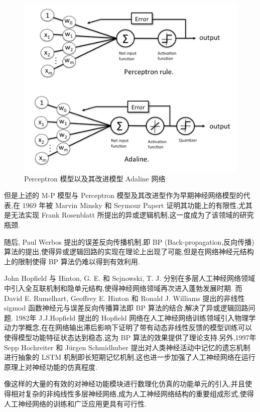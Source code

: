 \begin{figure}[H]
	\centering
	\includegraphics[scale=0.7]{Figures/perceptron.png}
	\caption{Perceptron 模型以及其改进模型 Adaline 网络}
\end{figure}

但是上述的 M-P 模型与 Perceptron 模型及其改进型作为早期神经网络模型的代表,在 1969 年被 Marvin Minsky 和 Seymour Papert 证明其功能上的有限性,尤其是无法实现 Frank Rosenblatt 所提出的异或逻辑机制,这一度成为了该领域的研究瓶颈.\cite{perceptronlimit}

随后, Paul Werbos 提出的误差反向传播机制,即 BP (Back-propagation,反向传播) 算法的提出,使得异或逻辑回路的实现在理论上出现了可能,但是在网络神经元结构上的限制使得 BP 算法仍难以得到有效利用.

John Hopfield 与 Hinton, G. E. 和 Sejnowski, T. J. 分别在多层人工神经网络领域中引入全互联机制和隐单元结构,使得神经网络领域再次进入蓬勃发展时期. 而 David E. Rumelhart, Geoffrey E. Hinton 和 Ronald J. Williams 提出的非线性 sigmod 函数神经元与误差反向传播算法即 BP 算法的结合,解决了异或逻辑回路问题. 1982年 J.J.Hopfield 提出的 Hopfield 网络在人工神经网络训练领域引入物理学动力学概念,在在网络输出滞后影响下证明了带有动态非线性反馈的模型训练可以使得模型功能特征状态达到稳态\cite{bp},这为 BP 算法的效果提供了理论支持.另外,1997年 Sepp Hochreiter 和 Jürgen Schmidhuber 提出对人类神经活动中记忆的遗忘机制进行抽象的 LSTM 机制即长短期记忆机制\cite{lstm},这也进一步加强了人工神经网络在运行原理上对神经功能的仿真程度.

像这样的大量的有效的对神经功能模块进行数理化仿真的功能单元的引入,并且使得相对复杂的非纯线性多层神经网络,成为人工神经网络结构的重要组成形式,使得人工神经网络的训练和广泛应用更具有可行性.

